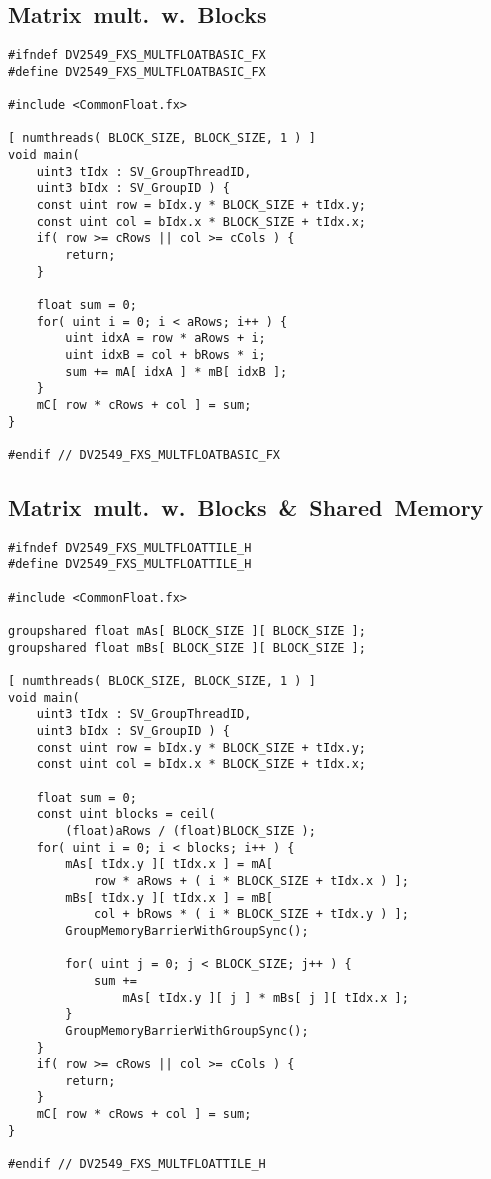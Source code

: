 \documentclass[fleqn,10pt]{SelfArx} %
\begin{document}
\subsection*{Matrix~mult.~w.~Blocks}
\begin{lstlisting}
#ifndef DV2549_FXS_MULTFLOATBASIC_FX
#define DV2549_FXS_MULTFLOATBASIC_FX

#include <CommonFloat.fx>

[ numthreads( BLOCK_SIZE, BLOCK_SIZE, 1 ) ]
void main(
	uint3 tIdx : SV_GroupThreadID,
	uint3 bIdx : SV_GroupID ) {
	const uint row = bIdx.y * BLOCK_SIZE + tIdx.y;
	const uint col = bIdx.x * BLOCK_SIZE + tIdx.x;
	if( row >= cRows || col >= cCols ) {
		return;
	}
        
	float sum = 0;
	for( uint i = 0; i < aRows; i++ ) {
		uint idxA = row * aRows + i;
		uint idxB = col + bRows * i;
		sum += mA[ idxA ] * mB[ idxB ];
	}
	mC[ row * cRows + col ] = sum;
}

#endif // DV2549_FXS_MULTFLOATBASIC_FX
\end{lstlisting}

\subsection*{Matrix~mult.~w.~Blocks~\&~Shared~Memory}
\begin{lstlisting}
#ifndef DV2549_FXS_MULTFLOATTILE_H
#define DV2549_FXS_MULTFLOATTILE_H

#include <CommonFloat.fx>

groupshared float mAs[ BLOCK_SIZE ][ BLOCK_SIZE ];
groupshared float mBs[ BLOCK_SIZE ][ BLOCK_SIZE ];

[ numthreads( BLOCK_SIZE, BLOCK_SIZE, 1 ) ]
void main(
	uint3 tIdx : SV_GroupThreadID,
	uint3 bIdx : SV_GroupID ) {
	const uint row = bIdx.y * BLOCK_SIZE + tIdx.y;
	const uint col = bIdx.x * BLOCK_SIZE + tIdx.x;
	
	float sum = 0;
	const uint blocks = ceil( 
		(float)aRows / (float)BLOCK_SIZE );
	for( uint i = 0; i < blocks; i++ ) {
		mAs[ tIdx.y ][ tIdx.x ] = mA[ 
			row * aRows + ( i * BLOCK_SIZE + tIdx.x ) ];
		mBs[ tIdx.y ][ tIdx.x ] = mB[ 
			col + bRows * ( i * BLOCK_SIZE + tIdx.y ) ];
		GroupMemoryBarrierWithGroupSync();
        
		for( uint j = 0; j < BLOCK_SIZE; j++ ) {
			sum += 
				mAs[ tIdx.y ][ j ] * mBs[ j ][ tIdx.x ];
		}
		GroupMemoryBarrierWithGroupSync();
	}
	if( row >= cRows || col >= cCols ) {
		return;
	}
	mC[ row * cRows + col ] = sum;
}

#endif // DV2549_FXS_MULTFLOATTILE_H

\end{lstlisting}



\end{document}
